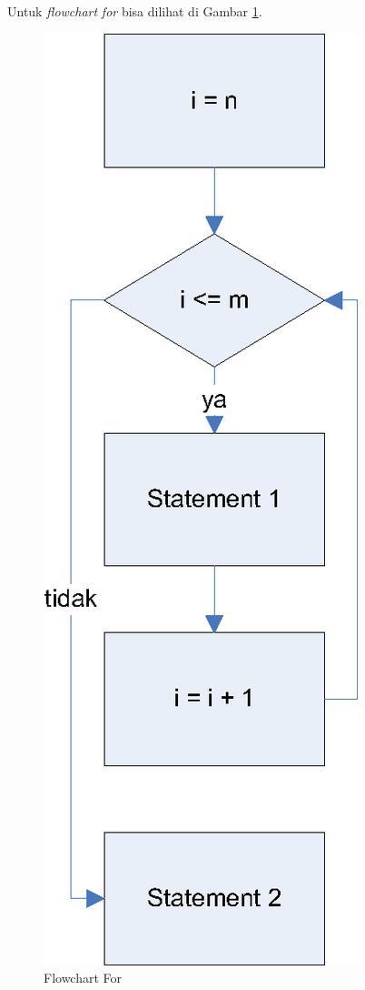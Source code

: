 \newpage

Untuk \textit{flowchart} \textit{for} bisa dilihat di Gambar \ref{fig:flowchartFor}.
\begin{figure}[h!]%
\centering
\includegraphics[scale=0.6]{fig/flowchart-FOR.eps}%
\caption{Flowchart For}%
\label{fig:flowchartFor}%
\end{figure}


